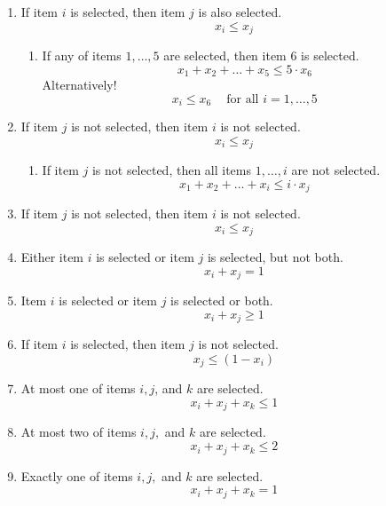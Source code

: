 \begin{enumerate}
 \item If item $i$ is selected, then item $j$ is also selected.
 \begin{equation}
 x_i \leq x_j
 \end{equation}
 \begin{enumerate}
 \item If any of items $1, \dots, 5$ are selected, then item $6$ is selected.
 \begin{equation}
 x_1 + x_2 + \dots + x_5 \leq 5 \cdot x_6
 \end{equation}
 Alternatively!
 \begin{equation}
 x_i \leq x_6 \ \ \ \ \text{ for all } i=1, \dots, 5
 \end{equation}
 \end{enumerate}
 \item If item $j$ is not selected, then item $i$ is not selected.
 \begin{equation}
x_i \leq x_j
 \end{equation}
  \begin{enumerate}
 \item If item $j$ is not selected, then all items $1, \dots, i$ are not selected.
 \begin{equation}
 x_1 + x_2 + \dots + x_i \leq i \cdot x_j
 \end{equation}
 \end{enumerate}
  \item If item $j$ is not selected, then item $i$ is not selected.
 \begin{equation}
x_i \leq x_j
 \end{equation}
\item Either item $i$ is selected or item $j$ is selected, but not both.
 \begin{equation}
 x_i + x_j = 1
 \end{equation}
\item Item $i$ is selected or item $j$ is selected or both.
 \begin{equation}
 x_i + x_j \geq 1
 \end{equation}
\item If item $i$ is selected, then item $j$ is not selected.
 \begin{equation}
x_j \leq (1-x_i)
 \end{equation}

\item At most one of items $i ,j$, and $k$ are selected.
 \begin{equation}
 x_i + x_j + x_k \leq 1
 \end{equation}
\item At most two of items $i,j,$ and $k$ are selected.
 \begin{equation}
 x_i + x_j + x_k \leq 2
 \end{equation}
\item Exactly one of items $i,j,$ and $k$ are selected.
 \begin{equation}
  x_i + x_j + x_k = 1
 \end{equation}
\end{enumerate}

